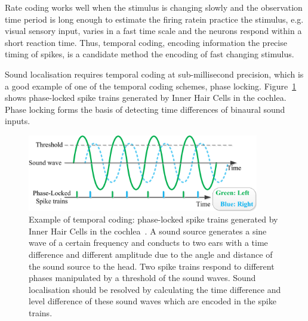 Rate coding works well when the stimulus is changing slowly and the observation time period is long enough to estimate the firing rate\DIFdelbegin {}\DIFdelend \DIFaddbegin {}\DIFaddend in practice the stimulus, e.g. visual sensory input, varies in a fast time scale and the neurons respond within a short reaction time.
Thus, temporal coding, encoding information \DIFdelbegin {}\DIFdelend \DIFaddbegin {}\DIFaddend the precise timing of spikes, is a candidate method \DIFdelbegin {}\DIFdelend \DIFaddbegin {}\DIFaddend the encoding of \DIFaddbegin {}\DIFaddend fast changing stimulus.

Sound localisation requires temporal coding at sub-millisecond precision, which is a good example of one of the temporal coding schemes, phase locking.
Figure~\ref{Fig:audio_fibre} shows phase-locked spike trains generated by Inner Hair Cells in the cochlea.
Phase locking forms the basis
of detecting time differences of binaural sound inputs.
\begin{figure}[bt]
	\centering
	\includegraphics[width=0.9\textwidth]{pics_snn/phaselocking.png}
	\caption{Example of temporal coding: phase-locked spike trains generated by Inner Hair Cells in the cochlea~\DIFdelbeginFL {}\DIFdelendFL \DIFaddbeginFL {}\DIFaddendFL .
	A sound source generates a sine wave of a certain frequency and conducts to two ears with a time difference and different amplitude due to the angle and distance of the sound source to the head.
	Two spike trains respond to different phases manipulated by a threshold of the sound waves.
	Sound localisation should be resolved by calculating the time difference and level difference of these sound waves which are encoded in the spike trains.
    }
	\label{Fig:audio_fibre}
\end{figure}

